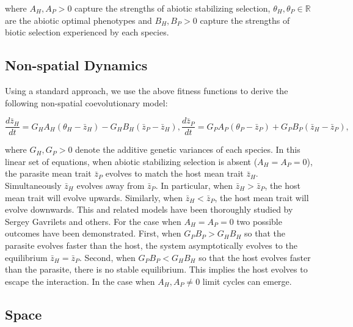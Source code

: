 \documentclass{article}
\begin{document}
where \(A_H,A_P>0\) capture the strengths of abiotic stabilizing
selection, \(\theta_H,\theta_P\in\mathbb{R}\) are the abiotic optimal
phenotypes and \(B_H,B_P>0\) capture the strengths of biotic selection
experienced by each species.

\hypertarget{non-spatial-dynamics}{%
\subsection{Non-spatial Dynamics}\label{non-spatial-dynamics}}

Using a standard approach, we use the above fitness functions to derive
the following non-spatial coevolutionary model:

\begin{subequations}\label{non-spatial}
  \begin{equation}
    \frac{d\bar z_H}{dt}=G_HA_H(\theta_H-\bar z_H)-G_HB_H(\bar z_P-\bar z_H),
  \end{equation}
  \begin{equation}
    \frac{d\bar z_P}{dt}=G_PA_P(\theta_P-\bar z_P)+G_PB_P(\bar z_H-\bar z_P),
  \end{equation}
\end{subequations}

where \(G_H,G_P>0\) denote the additive genetic variances of each
species. In this linear set of equations, when abiotic stabilizing
selection is absent (\(A_H=A_P=0\)), the parasite mean trait
\(\bar z_P\) evolves to match the host mean trait \(\bar z_H\).
Simultaneously \(\bar z_H\) evolves away from \(\bar z_P\). In
particular, when \(\bar z_H>\bar z_P\), the host mean trait will evolve
upwards. Similarly, when \(\bar z_H<\bar z_P\), the host mean trait will
evolve downwards. This and related models have been thoroughly studied
by Sergey Gavrilets and others. For the case when \(A_H=A_P=0\) two
possible outcomes have been demonstrated. First, when \(G_PB_P>G_HB_H\)
so that the parasite evolves faster than the host, the system
asymptotically evolves to the equilibrium \(\bar z_H=\bar z_P\). Second,
when \(G_PB_P<G_HB_H\) so that the host evolves faster than the
parasite, there is no stable equilibrium. This implies the host evolves
to escape the interaction. In the case when \(A_H,A_P\neq0\) limit
cycles can emerge.

\hypertarget{space}{%
\subsection{Space}\label{space}}
\end{document}

